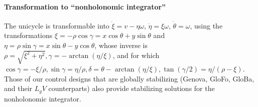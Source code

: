 \documentclass[journal,twoside,web]{ieeecolor}
\theoremstyle{definition}
\begin{document}

\paragraph{Transformation to ``nonholonomic integrator''} The unicycle is transformable into %
$\dot \xi = v-\eta \omega$, 
$\dot \eta = \xi \omega$, 
$\dot\theta = \omega$,
using the 
transformations
$\xi = - \rho\cos\gamma = x \cos\theta +y\sin\theta$ 
and 
$\eta = \rho \sin\gamma= x \sin\theta -y\cos\theta %
$, 
whose inverse is $\rho=\sqrt{\xi^2+\eta^2}, \gamma = - \arctan(\eta/\xi)$, and for which $\cos\gamma= -\xi/\rho, \sin\gamma = \eta/\rho, \delta = \theta-\arctan(\eta/\xi), \tan(\gamma/2) = \eta/(\rho-\xi)$. 
Those of our control designs that are globally stabilizing (Genova, GloFo, GloBa, and their $L_gV$ counterparts) also provide stabilizing solutions for the nonholonomic integrator. 
\end{document}
